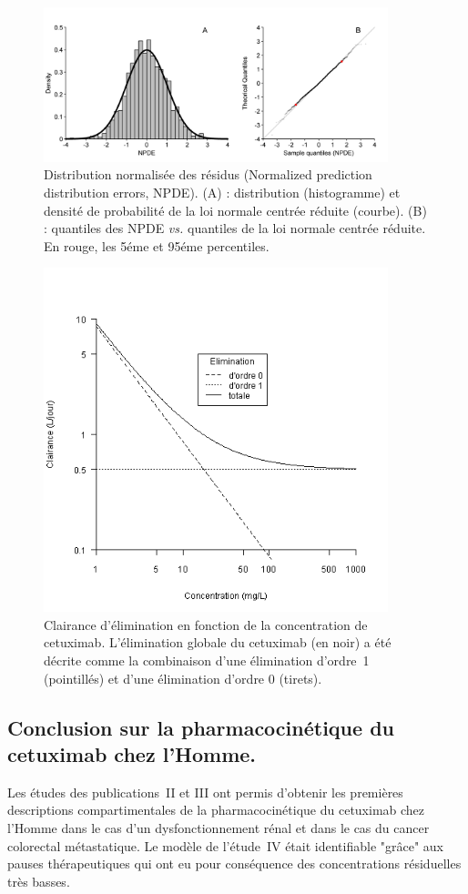 \begin{figure}[htbp]
	\centering
		\includegraphics[width=10cm]{figures/raster/FIG_21}
	\caption{Distribution normalisée des résidus (Normalized prediction distribution errors, NPDE). (A) : distribution (histogramme) et densité de probabilité de la loi normale centrée réduite (courbe). (B) : quantiles des NPDE \textit{vs.} quantiles de la loi normale centrée réduite. En rouge, les 5éme et 95éme percentiles.}
	\label{fig:21}
\end{figure}
\begin{figure}[htbp]
	\centering
		\includegraphics[width=10cm]{figures/raster/FIG_22}
	\caption{Clairance d'élimination en fonction de la concentration de cetuximab. L'élimination globale du cetuximab (en noir) a été décrite comme la combinaison d'une élimination d'ordre~1 (pointillés) et d'une élimination d'ordre 0 (tirets).}
	\label{fig:22}
\end{figure}

\subsection{Conclusion sur la pharmacocinétique du cetuximab chez l'Homme.}
Les études des publications~II et III ont permis d'obtenir les premières descriptions compartimentales de la pharmacocinétique du cetuximab chez l'Homme dans le cas d'un dysfonctionnement rénal et dans le cas du cancer colorectal métastatique. Le modèle de l'étude~IV était identifiable "grâce" aux pauses thérapeutiques qui ont eu pour conséquence des concentrations résiduelles très basses.

